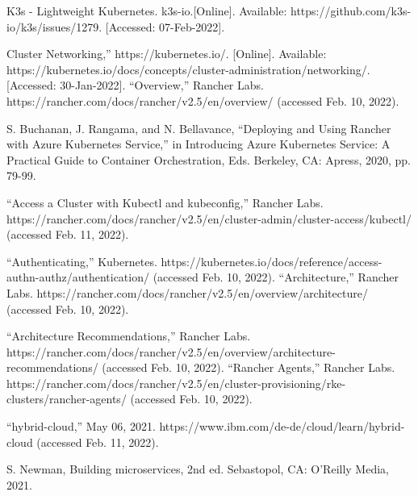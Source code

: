 \begin{thebibliography}{10}
   K3s - Lightweight Kubernetes. k3s-io.[Online]. Available: https://github.com/k3s-io/k3s/issues/1279. [Accessed: 07-Feb-2022].
  
   Cluster Networking,” https://kubernetes.io/. [Online]. 
  Available: https://kubernetes.io/docs/concepts/cluster-administration/networking/.[Accessed: 30-Jan-2022].
  “Overview,” Rancher Labs. https://rancher.com/docs/rancher/v2.5/en/overview/ (accessed Feb. 10, 2022).
  
  S. Buchanan, J. Rangama, and N. Bellavance, 
  “Deploying and Using Rancher with Azure Kubernetes Service,” in Introducing Azure Kubernetes Service: A Practical Guide to Container Orchestration, Eds. Berkeley, CA: Apress, 2020, pp. 79-99.

  “Access a Cluster with Kubectl and kubeconfig,” Rancher Labs. https://rancher.com/docs/rancher/v2.5/en/cluster-admin/cluster-access/kubectl/ (accessed Feb. 11, 2022).


  “Authenticating,” Kubernetes. https://kubernetes.io/docs/reference/access-authn-authz/authentication/ (accessed Feb. 10, 2022).
  “Architecture,” Rancher Labs. https://rancher.com/docs/rancher/v2.5/en/overview/architecture/ (accessed Feb. 10, 2022).

  “Architecture Recommendations,” Rancher Labs. https://rancher.com/docs/rancher/v2.5/en/overview/architecture-recommendations/ (accessed Feb. 10, 2022).
  “Rancher Agents,” Rancher Labs. https://rancher.com/docs/rancher/v2.5/en/cluster-provisioning/rke-clusters/rancher-agents/ (accessed Feb. 10, 2022).

“hybrid-cloud,” May 06, 2021. https://www.ibm.com/de-de/cloud/learn/hybrid-cloud (accessed Feb. 11, 2022).


S. Newman, Building microservices, 2nd ed. Sebastopol, CA: O’Reilly Media, 2021.

\end{thebibliography}